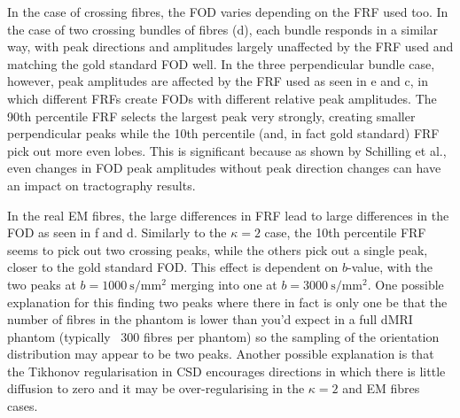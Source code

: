 In the case of crossing fibres, the \ac{FOD} varies depending on the \ac{FRF} used too. In the case of two crossing bundles of fibres (d), each bundle responds in a similar way, with peak directions and amplitudes largely unaffected by the \ac{FRF} used and matching the gold standard \ac{FOD} well.
In the three perpendicular bundle case, however, peak amplitudes are affected by the \ac{FRF} used as seen in e and c, in which different \acp{FRF} create \acp{FOD} with different relative peak amplitudes. The 90th percentile \ac{FRF} selects the largest peak very strongly, creating smaller perpendicular peaks while the 10th percentile (and, in fact gold standard) \ac{FRF} pick out more even lobes.
This is significant because as shown by Schilling et al.\cite{Schilling2019}, even changes in \ac{FOD} peak amplitudes without peak direction changes can have an impact on tractography results.

In the real \ac{EM} fibres, the large differences in \ac{FRF} lead to large differences in the \ac{FOD} as seen in f and d. Similarly to the $\kappa=2$ case, the 10th percentile \ac{FRF} seems to pick out two crossing peaks, while the others pick out a single peak, closer to the gold standard \ac{FOD}. This effect is dependent on $b$-value, with the two peaks at $b = \SI{1000}{\second\per\milli\metre\squared}$ merging into one at $b=\SI{3000}{\second\per\milli\metre\squared}$.
One possible explanation for this finding two peaks where there in fact is only one be that the number of fibres in the phantom is lower than you'd expect in a full \ac{dMRI} phantom (typically ~300 fibres per phantom) so the sampling of the orientation distribution may appear to be two peaks. Another possible explanation is that the Tikhonov regularisation in \ac{CSD} \cite{Tournier2007} encourages directions in which there is little diffusion to zero and it may be over-regularising in the $\kappa=2$ and \ac{EM} fibres cases.


